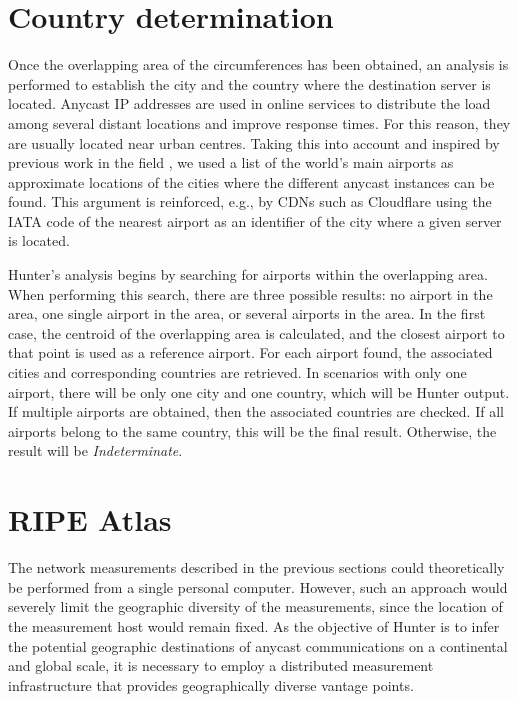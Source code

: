 \section{Country determination}\label{sc:hunter_country_determination}

Once the overlapping area of the circumferences has been obtained, an analysis is performed to establish the city and the country where the destination server is located. Anycast IP addresses are used in online services to distribute the load among several distant locations and improve response times. For this reason, they are usually located near urban centres. Taking this into account and inspired by previous work in the field \cite{Cicalese2016Latency-BasedSets}, we used a list of the world's main airports as approximate locations of the cities where the different anycast instances can be found. This argument is reinforced, e.g., by CDNs such as Cloudflare using the IATA code of the nearest airport as an identifier of the city where a given server is located.

Hunter's analysis begins by searching for airports within the overlapping area. When performing this search, there are three possible results: no airport in the area, one single airport in the area, or several airports in the area. In the first case, the centroid of the overlapping area is calculated, and the closest airport to that point is used as a reference airport. For each airport found, the associated cities and corresponding countries are retrieved. In scenarios with only one airport, there will be only one city and one country, which will be Hunter output. If multiple airports are obtained, then the associated countries are checked. If all airports belong to the same country, this will be the final result. Otherwise, the result will be \textit{Indeterminate}.

\section{RIPE Atlas}\label{hunter_ripe_atlas}

The network measurements described in the previous sections could theoretically be performed from a single personal computer. However, such an approach would severely limit the geographic diversity of the measurements, since the location of the measurement host would remain fixed. As the objective of Hunter is to infer the potential geographic destinations of anycast communications on a continental and global scale, it is necessary to employ a distributed measurement infrastructure that provides geographically diverse vantage points.

